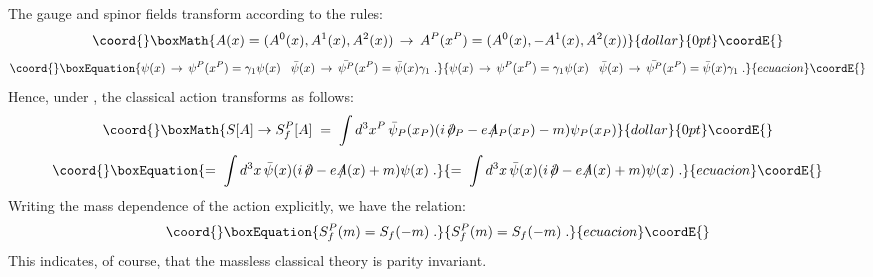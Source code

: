 \documentclass[a4paper,12pt]{article}
\providecommand{\spartial}{/\!\!\!\partial}
\providecommand{\Aslash}{/\!\!\!\!A}
\begin{document}
The gauge and spinor fields transform according to the rules:
$$\coord{}\boxMath{
A(x) =(A^0(x),A^1(x),A^2(x)) \, \to \,
A^P(x^P)=(A^0(x),-A^1(x),A^2(x))
}{dollar}{0pt}\coordE{}$$
\begin{equation}\coord{}\boxEquation{
 \label{fieldsparity}
\psi(x) \, \to\, \psi^P(x^P)=\gamma_1\psi(x)
\;\;\; \bar{\psi}(x) \, \to \, \bar{\psi^P}(x^P) =
\bar{\psi}(x)\gamma_1 \;.
}{
 \psi(x) \, \to\, \psi^P(x^P)=\gamma_1\psi(x)
\;\;\; \bar{\psi}(x) \, \to \, \bar{\psi^P}(x^P) =
\bar{\psi}(x)\gamma_1 \;.
}{ecuacion}\coordE{}\end{equation}
Hence, under \coordHE{}, the classical action transforms as
follows:
$$\coord{}\boxMath{
S[A] \to S_f^P[A] \;=\; \int d^3x^P\,
\bar{\psi}_P(x_P)(i\,\spartial_P-e\,\Aslash_P(x_P)-m)\psi_P(x_P)
}{dollar}{0pt}\coordE{}$$
\begin{equation}\coord{}\boxEquation{
=\;\int d^3x \, \bar{\psi}(x)(i\,\spartial-e\,\Aslash(x)+m)\psi(x) \;.
}{
=\;\int d^3x \, \bar{\psi}(x)(i\,\spartial-e\,\Aslash(x)+m)\psi(x) \;.
}{ecuacion}\coordE{}\end{equation}
Writing the mass dependence of the action explicitly, we have the
relation:
\begin{equation}\coord{}\boxEquation{
S_f^P(m)=S_f(-m) \;.
}{
S_f^P(m)=S_f(-m) \;.
}{ecuacion}\coordE{}\end{equation}
%
This indicates, of course, that the massless classical theory is
parity invariant.
\end{document}
